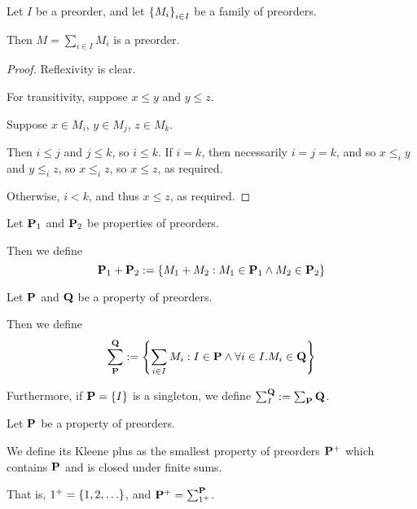 \begin{lemma}
  Let $I$ be a preorder, and let $\left\{ {M_i} \right\}_{i \in I}$ be a family of preorders.

  Then $M = \sum_{i \in I} M_i$ is a preorder.
\end{lemma}

\begin{proof}
  Reflexivity is clear.

  For transitivity, suppose $x \le y$ and $y \le z$.

  Suppose $x \in M_i$, $y \in M_j$, $z \in M_k$.

  Then $i \le j$ and $j \le k$, so $i \le k$.
  If $i = k$, then necessarily $i = j = k$, and so $x \le_i y$ and $y \le_i z$,
  so $x \le_i z$, so $x \le z$, as required.

  Otherwise, $i < k$, and thus $x \le z$, as required.
\end{proof}

\begin{definition}
  Let $\mathbf{P}_1$ and $\mathbf{P}_2$ be properties of preorders.

  Then we define
  \[
    \mathbf{P}_1 + \mathbf{P}_2 := \left\{ {M_1 + M_2 : M_1 \in \mathbf{P}_1 \wedge M_2 \in \mathbf{P}_2} \right\}
  \]
\end{definition}

\begin{definition}
  Let $\mathbf{P}$ and $\mathbf{Q}$ be a property of preorders.

  Then we define
  \[
    \sum_{\mathbf{P}}^{\mathbf{Q}} := \left\{ {\sum_{i \in I}{M_i} : I \in \mathbf{P} \wedge \forall i \in I. M_i \in \mathbf{Q}} \right\}
  \]

  Furthermore, if $\mathbf{P} = \left\{ {I} \right\}$ is a singleton, we define $\sum_{I}^{\mathbf{Q}} := \sum_{\mathbf{P}}{\mathbf{Q}}$.
\end{definition}

\begin{definition}
  Let $\mathbf{P}$ be a property of preorders.

  We define its Kleene plus as the smallest property of preorders $\mathbf{P}^+$ which contains $\mathbf{P}$ and is closed under
  finite sums.

  That is, $1^+ = \left\{ {1, 2, \ldots} \right\}$, and $\mathbf{P}^+ = \sum_{1^+}^{\mathbf{P}}$.
\end{definition}
